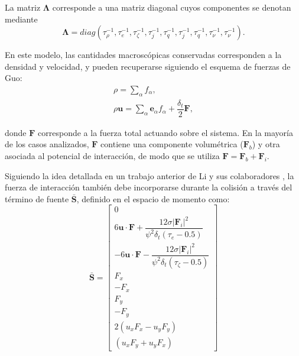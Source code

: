 La matriz $\bm{\Lambda}$ corresponde a una matriz diagonal cuyos componentes se denotan mediante
\begin{equation}
	\bm{\Lambda}=diag(\tau_{\rho}^{-1},\tau_{e}^{-1},\tau_{\zeta}^{-1},\tau_{j}^{-1},\tau_{q}^{-1},\tau_{j}^{-1},\tau_{q}^{-1},\tau_{\nu}^{-1},\tau_{\nu}^{-1}).
\end{equation}

En este modelo, las cantidades macrosc\'opicas conservadas corresponden a la densidad y velocidad, y pueden recuperarse siguiendo el esquema de fuerzas de Guo:
\begin{equation}
	\begin{gathered}
		\rho = \sum_{\alpha} f_{\alpha}, \\
		\rho \bm{u} = \sum_{\alpha} \bm{e}_{\alpha} f_{\alpha} + \dfrac{\delta_t}{2} \bm{F},
	\end{gathered}
\end{equation}

donde $\bm{F}$ corresponde a la fuerza total actuando sobre el sistema. En la mayor\'ia de los casos analizados, $\bm{F}$ contiene una componente volum\'etrica ($\bm{F}_b$) y otra asociada al potencial de interacci\'on, de modo que se utiliza $\bm{F} = \bm{F}_b + \bm{F}_i$.

Siguiendo la idea detallada en un trabajo anterior de Li y sus colaboradores \cite{li_forcing_2012}, la fuerza de interacci\'on tambi\'en debe incorporarse durante la colisi\'on a trav\'es del t\'ermino de fuente $\bar{\bm{S}}$, definido en el espacio de momento como:
\begin{equation}
 \bar{\bm{S}} = 
 \left[ 
 	\begin{array}{c} 
 		0	\\
 		6 \bm{u} \cdot \bm{F} + \dfrac{12\sigma |\bm{F}_i|^2}{\psi^2 \delta_t (\tau_e-0.5)} \\
 		-6 \bm{u} \cdot \bm{F} - \dfrac{12\sigma |\bm{F}_i|^2}{\psi^2 \delta_t (\tau_{\zeta}-0.5)} \\
 		F_x \\
 		-F_x \\
 		F_y \\
 		-F_y \\
 		2(u_xF_x - u_yF_y) \\
 		(u_xF_y + u_yF_x)
 	\end{array} 
 \right]
 \label{eq:s_li}
\end{equation}

